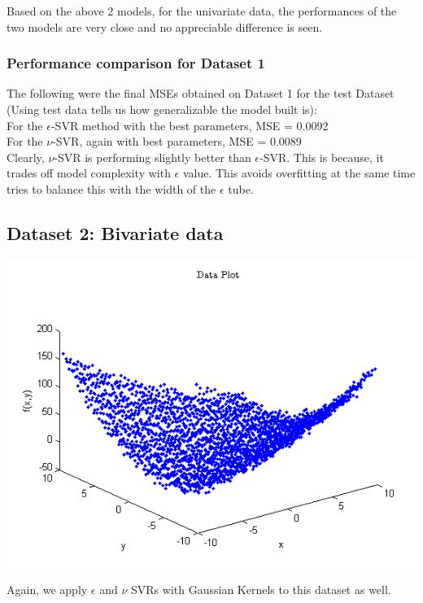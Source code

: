 \documentclass{article}
\begin{document}
Based on the above 2 models, for the univariate data, the performances of the two models are very close and no appreciable difference is seen.

\subsubsection{Performance comparison for Dataset 1}
The following were the final MSEs obtained on Dataset 1 for the test Dataset (Using test data tells us how generalizable the model built is): \\[5pt]
For the $\epsilon$-SVR method with the best parameters, MSE = 0.0092 \\
For the $\nu$-SVR, again with best parameters, MSE = 0.0089 \\[5pt]
Clearly, $\nu$-SVR is performing slightly better than $\epsilon$-SVR. This is because, it trades off model complexity with $\epsilon$ value. This avoids overfitting at the same time tries to balance this with the width of the $\epsilon$ tube.
\subsection{Dataset 2: Bivariate data}
\begin{center}
\includegraphics[scale=1]{Regression/bivar/bivar}
\end{center}
Again, we apply $\epsilon$ and $\nu$ SVRs with Gaussian Kernels to this dataset as well.
\end{document}
